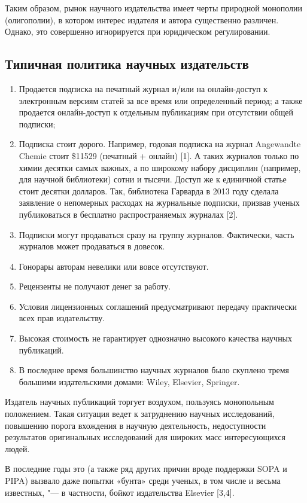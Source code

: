 \documentclass [10pt, a5paper]{article}
\begin{document}
Таким образом, рынок научного издательства имеет черты природной монополии (олигополии), в котором интерес издателя и автора существенно различен. Однако, это совершенно игнорируется при юридическом регулировании.

\subsection*{Типичная политика научных издательств}

\begin{enumerate}
  \item Продается подписка на печатный журнал и/или на онлайн-доступ к электронным версиям статей за все время или определенный период; а также продается онлайн-доступ к отдельным публикациям при отсутствии общей подписки;
  \item Подписка стоит дорого. Например, годовая подписка на журнал Angewandte Chemie стоит \$11529 (печатный + онлайн) [1]. А таких журналов только по химии десятки самых важных, а по широкому набору дисциплин (например, для научной библиотеки) сотни и тысячи. Доступ же к единичной статье стоит десятки долларов. Так, библиотека Гарварда в 2013 году сделала заявление о непомерных расходах на журнальные подписки, призвав ученых публиковаться в бесплатно распространяемых журналах [2].
  \item Подписки могут продаваться сразу на группу журналов. Фактически, часть журналов может продаваться в довесок.
  \item Гонорары авторам невелики или вовсе отсутствуют.
  \item Рецензенты не получают денег за работу.
  \item Условия лицензионных соглашений предусматривают передачу практически всех прав издательству.
  \item Высокая стоимость не гарантирует однозначно высокого качества научных публикаций.
  \item В последнее время большинство научных журналов было скуплено тремя большими издательскими домами: Wiley, Elsevier, Springer.
\end{enumerate}

Издатель научных публикаций торгует воздухом, пользуясь монопольным положением. Такая ситуация ведет к затруднению научных исследований, повышению порога вхождения в научную деятельность, недоступности результатов оригинальных исследований для широких масс интересующихся людей.

В последние годы это (а также ряд других причин вроде поддержки SOPA и PIPA) вызвало даже попытки «бунта» среди ученых, в том числе и весьма известных, "--- в частности, бойкот издательства Elsevier [3,4].
\end{document}
